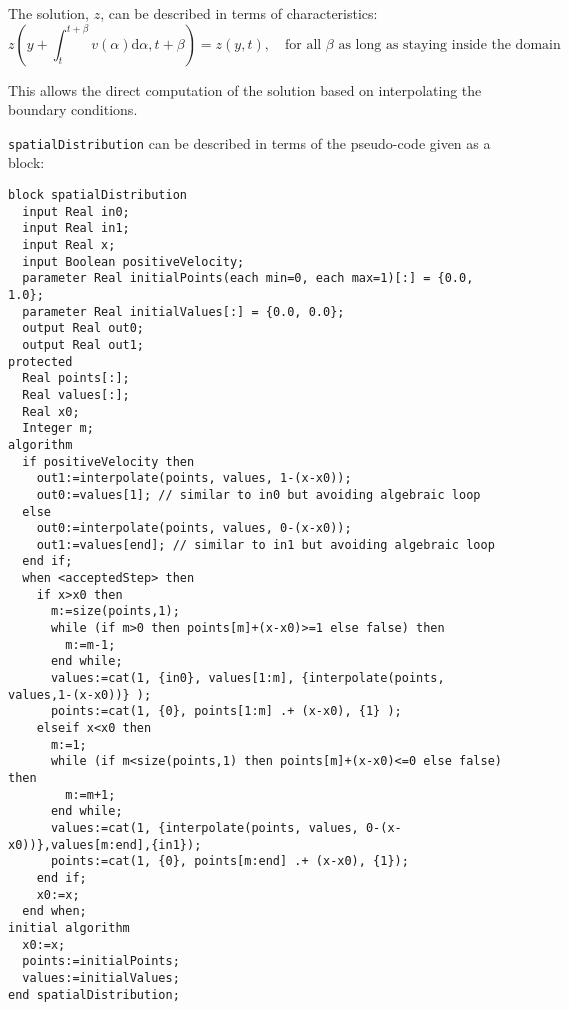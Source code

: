 The solution, $z$, can be described in terms of characteristics:
\begin{equation*}
z(y+\int_{t}^{t+\beta} v(\alpha) \mathrm{d}\alpha, t+\beta) = z(y, t),\quad\text{for all $\beta$ as long as staying inside the domain}
\end{equation*}

This allows the direct computation of the solution based on interpolating the
boundary conditions.

\lstinline!spatialDistribution! can be described in terms of the pseudo-code given as a block:
\begin{lstlisting}[language=modelica]
block spatialDistribution
  input Real in0;
  input Real in1;
  input Real x;
  input Boolean positiveVelocity;
  parameter Real initialPoints(each min=0, each max=1)[:] = {0.0, 1.0};
  parameter Real initialValues[:] = {0.0, 0.0};
  output Real out0;
  output Real out1;
protected
  Real points[:];
  Real values[:];
  Real x0;
  Integer m;
algorithm
  if positiveVelocity then
    out1:=interpolate(points, values, 1-(x-x0));
    out0:=values[1]; // similar to in0 but avoiding algebraic loop
  else
    out0:=interpolate(points, values, 0-(x-x0));
    out1:=values[end]; // similar to in1 but avoiding algebraic loop
  end if;
  when <acceptedStep> then
    if x>x0 then
      m:=size(points,1);
      while (if m>0 then points[m]+(x-x0)>=1 else false) then
        m:=m-1;
      end while;
      values:=cat(1, {in0}, values[1:m], {interpolate(points, values,1-(x-x0))} );
      points:=cat(1, {0}, points[1:m] .+ (x-x0), {1} );
    elseif x<x0 then
      m:=1;
      while (if m<size(points,1) then points[m]+(x-x0)<=0 else false) then
        m:=m+1;
      end while;
      values:=cat(1, {interpolate(points, values, 0-(x-x0))},values[m:end],{in1});
      points:=cat(1, {0}, points[m:end] .+ (x-x0), {1});
    end if;
    x0:=x;
  end when;
initial algorithm
  x0:=x;
  points:=initialPoints;
  values:=initialValues;
end spatialDistribution;
\end{lstlisting}

